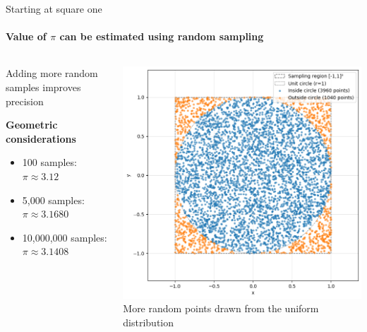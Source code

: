 \documentclass{beamer}
\begin{document}
\begin{frame}{Starting at square one}
  \framesubtitle{Value of $\pi$ can be estimated using random sampling}
  \begin{columns}[c]
    \begin{column}{0.5\textwidth}
      Adding more random samples improves precision
      \vspace{0.5cm}

      \textbf{Geometric considerations}
      \begin{itemize}
        \item 100 samples: $\pi \approx 3.12$
        \item 5,000 samples: $\pi \approx 3.1680$
        \item 10,000,000 samples: $\pi \approx 3.1408$
      \end{itemize}
    \end{column}
    \begin{column}{0.5\textwidth}
      \begin{center}
        \includegraphics[width=\textwidth]{images/more_samples.png}
        \\[0.2cm]
        \small{More random points drawn from the uniform distribution}
      \end{center}
    \end{column}
  \end{columns}
\end{frame}
\end{document}
